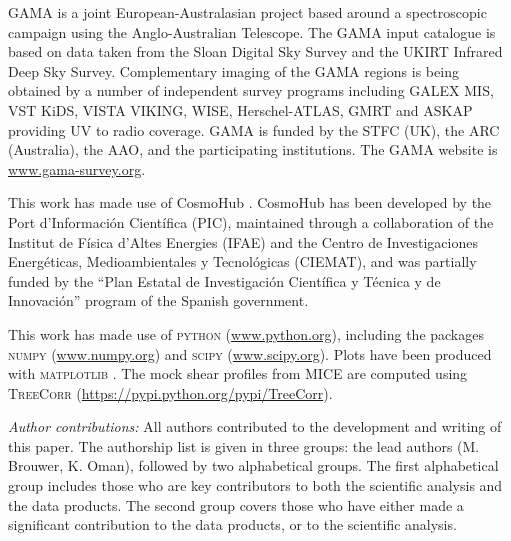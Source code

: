 \documentclass[usenatbib]{mnras}
\begin{document}
GAMA is a joint European-Australasian project based around a spectroscopic campaign using the Anglo-Australian Telescope. The GAMA input catalogue is based on data taken from the Sloan Digital Sky Survey and the UKIRT Infrared Deep Sky Survey. Complementary imaging of the GAMA regions is being obtained by a number of independent survey programs including GALEX MIS, VST KiDS, VISTA VIKING, WISE, Herschel-ATLAS, GMRT and ASKAP providing UV to radio coverage. GAMA is funded by the STFC (UK), the ARC (Australia), the AAO, and the participating institutions. The GAMA website is \url{www.gama-survey.org}.

This work has made use of CosmoHub \cite[]{carretero2017,tallada2020}. CosmoHub has been developed by the Port d'Informaci{\'o}n Cient{\'i}fica (PIC), maintained through a collaboration of the Institut de F{\'i}sica d'Altes Energies (IFAE) and the Centro de Investigaciones Energ{\'e}ticas, Medioambientales y Tecnol{\'o}gicas (CIEMAT), and was partially funded by the ``Plan Estatal de Investigaci{\'o}n Cient{\'i}fica y T{\'e}cnica y de Innovaci{\'o}n'' program of the Spanish government.

This work has made use of {\scshape python} (\url{www.python.org}), including the packages {\scshape numpy} (\url{www.numpy.org}) and {\scshape scipy} (\url{www.scipy.org}). Plots have been produced with {\scshape matplotlib} \cite[]{hunter2007}. The mock shear profiles from MICE are computed using {\scshape TreeCorr} (\url{https://pypi.python.org/pypi/TreeCorr}).

\emph{Author contributions:} All authors contributed to the development and writing of this paper. The authorship list is given in three groups: the lead authors (M. Brouwer, K. Oman), followed by two alphabetical groups. The first alphabetical group includes those who are key contributors to both the scientific analysis and the data products. The second group covers those who have either made a significant contribution to the data products, or to the scientific analysis.








\end{document}

